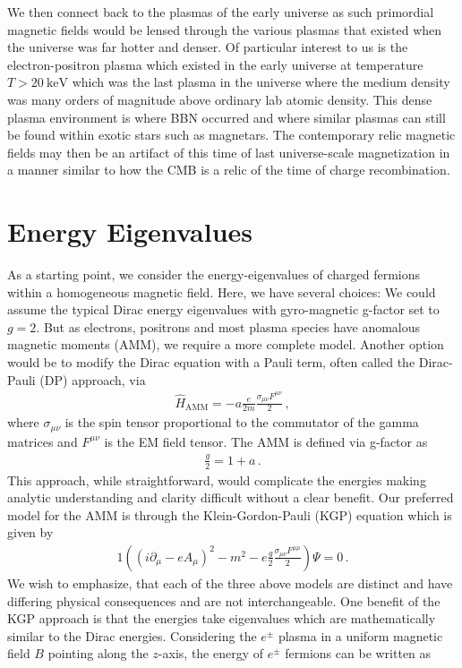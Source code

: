 \documentclass[Universe,article,submit,moreauthors,pdftex]{Definitions/mdpi}
\begin{document}
We then connect back to the plasmas of the early universe as such primordial magnetic fields would be lensed through the various plasmas that existed when the universe was far hotter and denser. Of particular interest to us is the electron-positron plasma which existed in the early universe at temperature $T>20\ \mathrm{keV}$ which was the last plasma in the universe where the medium density was many orders of magnitude above ordinary lab atomic density. This dense plasma environment is where BBN occurred and where similar plasmas can still be found within exotic stars such as magnetars. The contemporary relic magnetic fields may then be an artifact of this time of last universe-scale magnetization in a manner similar to how the CMB is a relic of the time of charge recombination. 
\section{Energy Eigenvalues}\label{sec:energy}
\noindent As a starting point, we consider the energy-eigenvalues of charged fermions within a homogeneous magnetic field. Here, we have several choices: We could assume the typical Dirac energy eigenvalues with gyro-magnetic g-factor set to $g=2$. But as electrons, positrons and most plasma species have anomalous magnetic moments (AMM), we require a more complete model. Another option would be to modify the Dirac equation with a Pauli term, often called the Dirac-Pauli (DP) approach, via
\begin{align}
  \label{Pauli} \hat{H}_{\mathrm{AMM}} = -a\frac{e}{2m}\frac{\sigma_{\mu\nu}F^{\mu\nu}}{2}\,,
\end{align}
where $\sigma_{\mu\nu}$ is the spin tensor proportional to the commutator of the gamma matrices and $F^{\mu\nu}$ is the EM field tensor. The AMM is defined via g-factor as
\begin{align}
  \label{AMM} \frac{g}{2}=1+a\,.
\end{align}
This approach, while straightforward, would complicate the energies making analytic understanding and clarity difficult without a clear benefit. Our preferred model for the AMM is through the Klein-Gordon-Pauli (KGP) equation which is given by
\begin{alignat}{1}
  \label{KGP} \left(\left(i\partial_{\mu}-eA_{\mu}\right)^{2}-m^{2}-e\frac{g}{2}\frac{\sigma_{\mu\nu}F^{\mu\mu}}{2}\right)\Psi=0\,.
\end{alignat}
We wish to emphasize, that each of the three above models are distinct and have differing physical consequences and are not interchangeable. One benefit of the KGP approach is that the energies take eigenvalues which are mathematically similar to the Dirac energies. Considering the $e^\pm$ plasma in a uniform magnetic field $B$ pointing along the $z$-axis, the energy of $e^\pm$ fermions can be written as
\end{document}
